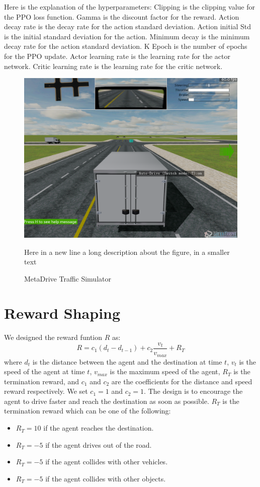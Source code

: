 Here is the explanation of the hyperparameters: Clipping is the clipping value for the PPO loss function.
Gamma is the discount factor for the reward.
Action decay rate is the decay rate for the action standard deviation.
Action initial Std is the initial standard deviation for the action.
Minimum decay is the minimum decay rate for the action standard deviation.
K Epoch is the number of epochs for the PPO update.
Actor learning rate is the learning rate for the actor network.
Critic learning rate is the learning rate for the critic network.

\begin{figure}[htbp]
    \centering
    \includegraphics[width=12cm]{assets/meta}
    \caption{MetaDrive Traffic Simulator}
    \label{fig:metadrive}
    \small
    Here in a new line a long description about the figure, in a smaller text
\end{figure}


\section{Reward Shaping}\label{sec:reward-shaping}
We designed the reward funtion $R$ as:
\begin{equation}
    R = c_{1}(d_{t} - d_{t-1}) + c_{2}\frac{v_{t}}{v_{max}} + R_{T}
\end{equation}
where $d_{t}$ is the distance between the agent and the destination at time $t$, $v_{t}$ is the speed of the agent at time $t$, $v_{max}$ is the maximum speed of the agent, $R_{T}$ is the termination reward, and $c_{1}$ and $c_{2}$ are the coefficients for the distance and speed reward respectively.
We set $c_{1} = 1$ and $c_{2} = 1$.
The design is to encourage the agent to drive faster and reach the destination as soon as possible.
$R_{T}$ is the termination reward which can be one of the following:
\begin{itemize}
    \item $R_{T} = 10$ if the agent reaches the destination.
    \item $R_{T} = -5$ if the agent drives out of the road.
    \item $R_{T} = -5$ if the agent collides with other vehicles.
    \item $R_{T} = -5$ if the agent collides with other objects.
\end{itemize}


